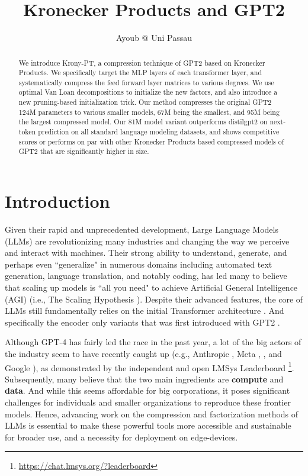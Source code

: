 \documentclass{article}
\title{Kronecker Products and GPT2}
\author{Ayoub @ Uni Passau}
\begin{document}
\maketitle

\begin{abstract}
	We introduce Krony-PT, a compression technique of GPT2 \cite{radford2019language} based on Kronecker Products. We specifically target the MLP layers of each transformer layer, and systematically compress the feed forward layer matrices to various degrees. We use optimal Van Loan decompositions to initialize the new factors, and also introduce a new pruning-based initialization trick. Our method compresses the original GPT2 124M parameters to various smaller models, 67M being the smallest, and 95M being the largest compressed model. Our 81M model variant outperforms distilgpt2 on next-token prediction on all standard language modeling datasets, and shows competitive scores or performs on par with other Kronecker Products based compressed models of GPT2 that are significantly higher in size. 
\end{abstract}

\newpage

\tableofcontents
\newpage

\section{Introduction}
\label{sec:Introduction}

Given their rapid and unprecedented development, Large Language Models (LLMs) are revolutionizing many industries and changing the way we perceive and interact with machines. Their strong ability to understand, generate, and perhaps even ``generalize" in numerous domains including automated text generation, language translation, and notably coding, has led many to believe that scaling up models is ``all you need" to achieve Artificial General Intelligence (AGI) (i.e., The Scaling Hypothesis \cite{branwen2021scaling}). Despite their advanced features, the core of LLMs still fundamentally relies on the initial Transformer architecture \cite{vaswani2017attention}. And specifically the encoder only variants that was first introduced with GPT2 \cite{radford2019language}. 

Although GPT-4 \cite{achiam2023gpt} has fairly led the race in the past year, a lot of the big actors of the industry seem to have recently caught up (e.g., Anthropic \cite{claude3}, Meta \cite{llama}, \cite{llama3} , and Google \cite{reid2024gemini}), as demonstrated by the independent and open LMSys Leaderboard \footnote{\href{https://chat.lmsys.org/?leaderboard}{https://chat.lmsys.org/?leaderboard}}. Subsequently, many believe that the two main ingredients are \textbf{compute} and \textbf{data}. And while this seems affordable for big corporations, it poses significant challenges for individuals and smaller organizations to reproduce these frontier models. Hence, advancing work on the compression and factorization methods of LLMs is essential to make these powerful tools more accessible and sustainable for broader use, and a necessity for deployment on edge-devices.
\end{document}
